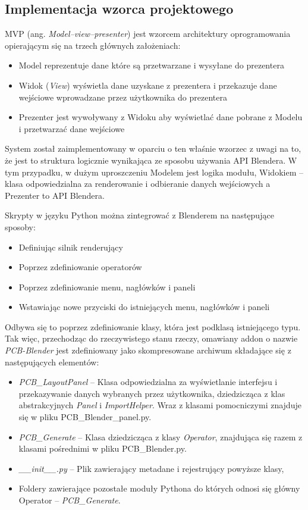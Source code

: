 \documentclass{xmgr}
\begin{document}
\subsection{Implementacja wzorca projektowego} \label{mvp}
MVP (ang. \emph{Model–view–presenter}) jest wzorcem architektury oprogramowania opierającym się na trzech głównych założeniach\cite{mvp}:
\begin{itemize}
\item Model reprezentuje dane które są przetwarzane i wysyłane do prezentera
\item Widok (\emph{View}) wyświetla dane uzyskane z prezentera i przekazuje dane wejściowe wprowadzane przez użytkownika do prezentera
\item Prezenter jest wywoływany z Widoku aby wyświetlać dane pobrane z Modelu i przetwarzać dane wejściowe
\end{itemize}
System został zaimplementowany w oparciu o ten właśnie wzorzec z uwagi na to, że jest to struktura logicznie wynikająca ze sposobu używania API Blendera.
W tym przypadku, w dużym uproszczeniu Modelem jest logika modułu, Widokiem -- klasa odpowiedzialna za renderowanie i odbieranie danych wejściowych a Prezenter to API Blendera.
\newline


Skrypty w języku Python można zintegrować z Blenderem na następujące sposoby:
\begin{itemize}
\item Definiując silnik renderujący
\item Poprzez zdefiniowanie operatorów
\item Poprzez zdefiniowanie menu, nagłówków i paneli
\item Wstawiając nowe przyciski do istniejących menu, nagłówków i paneli
\end{itemize}

Odbywa się to poprzez zdefiniowanie klasy, która jest podklasą istniejącego typu.
Tak więc, przechodząc do rzeczywistego stanu rzeczy, omawiany addon o nazwie \emph{PCB-Blender} jest zdefiniowany jako skompresowane archiwum składające się z następujących elementów:
\begin{itemize}
\item \emph{PCB\_LayoutPanel} -- Klasa odpowiedzialna za wyświetlanie interfejsu i przekazywanie danych wybranych przez użytkownika, dziedzicząca z klas abstrakcyjnych \emph{Panel} i \emph{ImportHelper}. Wraz z klasami pomocniczymi znajduje się w pliku PCB\_Blender\_panel.py.
\item \emph{PCB\_Generate} -- Klasa dziedzicząca z klasy \emph{Operator}, znajdująca się razem z klasami pośrednimi w pliku PCB\_Blender.py.
\item \emph{\_\_init\_\_.py} -- Plik zawierający metadane i rejestrujący powyższe klasy,
\item Foldery zawierające pozostałe moduły Pythona do których odnosi się główny Operator -- \emph{PCB\_Generate}.
\end{itemize}
\end{document}
